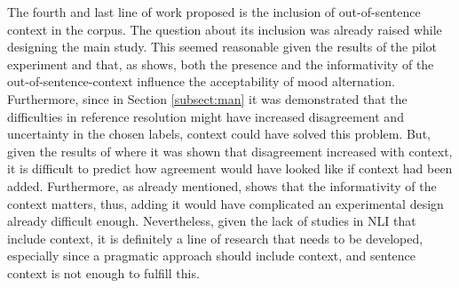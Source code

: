 The fourth and last line of work proposed is the inclusion of out-of-sentence context in the corpus. The question about its inclusion was already raised while designing the main study. This seemed reasonable given the results of the pilot experiment and that, as \citet{faulkner2021systematic} shows, both the presence and the informativity of the out-of-sentence-context influence the acceptability of mood alternation. Furthermore, since in Section \ref{subsect:man} it was demonstrated that the difficulties in reference resolution might have increased disagreement and uncertainty in the chosen labels, context could have solved this problem. But, given the results of \citet{pavlick2019inherent} where it was shown that disagreement increased with context, it is difficult to predict how agreement would have looked like if context had been added. Furthermore, as already mentioned, \citet{faulkner2021systematic} shows that the informativity of the context matters, thus, adding it would have complicated an experimental design already difficult enough. Nevertheless, given the lack of studies in NLI that include context, it is definitely a line of research that needs to be developed, especially since a pragmatic approach should include context, and sentence context is not enough to fulfill this.\\